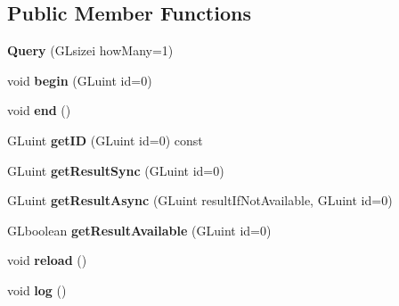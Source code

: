 \subsection*{Public Member Functions}
\begin{DoxyCompactItemize}
\item 
\hypertarget{classfillwave_1_1core_1_1Query_ab1c259391277bccf2407a72638550687}{}{\bfseries Query} (G\+Lsizei how\+Many=1)\label{classfillwave_1_1core_1_1Query_ab1c259391277bccf2407a72638550687}

\item 
\hypertarget{classfillwave_1_1core_1_1Query_a15b1f1e23cf66f89ac976a3aef040c9f}{}void {\bfseries begin} (G\+Luint id=0)\label{classfillwave_1_1core_1_1Query_a15b1f1e23cf66f89ac976a3aef040c9f}

\item 
\hypertarget{classfillwave_1_1core_1_1Query_a1750f7a31bfc60a362ed009cdb1748e4}{}void {\bfseries end} ()\label{classfillwave_1_1core_1_1Query_a1750f7a31bfc60a362ed009cdb1748e4}

\item 
\hypertarget{classfillwave_1_1core_1_1Query_a6fefaa8026f11f86e13b98283a2ec183}{}G\+Luint {\bfseries get\+I\+D} (G\+Luint id=0) const \label{classfillwave_1_1core_1_1Query_a6fefaa8026f11f86e13b98283a2ec183}

\item 
\hypertarget{classfillwave_1_1core_1_1Query_a650596444148265e1de9471717b67e45}{}G\+Luint {\bfseries get\+Result\+Sync} (G\+Luint id=0)\label{classfillwave_1_1core_1_1Query_a650596444148265e1de9471717b67e45}

\item 
\hypertarget{classfillwave_1_1core_1_1Query_a8c0b187b72dec40a2eda132ecb516cf6}{}G\+Luint {\bfseries get\+Result\+Async} (G\+Luint result\+If\+Not\+Available, G\+Luint id=0)\label{classfillwave_1_1core_1_1Query_a8c0b187b72dec40a2eda132ecb516cf6}

\item 
\hypertarget{classfillwave_1_1core_1_1Query_af583a9cce081b03dc0dc4adc240ad1e0}{}G\+Lboolean {\bfseries get\+Result\+Available} (G\+Luint id=0)\label{classfillwave_1_1core_1_1Query_af583a9cce081b03dc0dc4adc240ad1e0}

\item 
\hypertarget{classfillwave_1_1core_1_1Query_aecd65a5f743252feec9382ea9f1427ef}{}void {\bfseries reload} ()\label{classfillwave_1_1core_1_1Query_aecd65a5f743252feec9382ea9f1427ef}

\item 
\hypertarget{classfillwave_1_1core_1_1Query_a781e0454d6ec6ceb3c40b72900d79e86}{}void {\bfseries log} ()\label{classfillwave_1_1core_1_1Query_a781e0454d6ec6ceb3c40b72900d79e86}

\end{DoxyCompactItemize}
